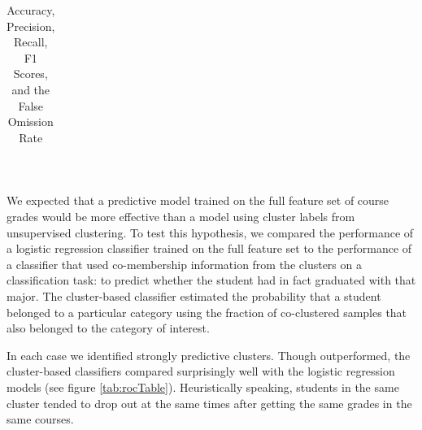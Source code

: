 \documentclass{sigchi}
\begin{document}
\begin{table}[hb]
{\begin{tabular}{cc|ccccc}
\end{tabular}}
\caption{Accuracy, Precision, Recall, F1 Scores, and the False Omission Rate}~\label{tab:scoresTable}

\end{table}

We expected that a predictive model trained on the full feature set of course grades would be more effective than a model using cluster labels from unsupervised clustering. To test this hypothesis, we compared the performance of a logistic regression classifier trained on the full feature set to the performance of a classifier that used co-membership information from the clusters on a classification task: to predict whether the student had in fact graduated with that major. The cluster-based classifier estimated the probability that a student belonged to a particular category using the fraction of co-clustered samples that also belonged to the category of interest.

In each case we identified strongly predictive clusters. Though outperformed, the cluster-based classifiers compared surprisingly well with the logistic regression models (see figure \ref{tab:rocTable}). Heuristically speaking, students in the same cluster tended to drop out at the same times after getting the same grades in the same courses. 
\end{document}
